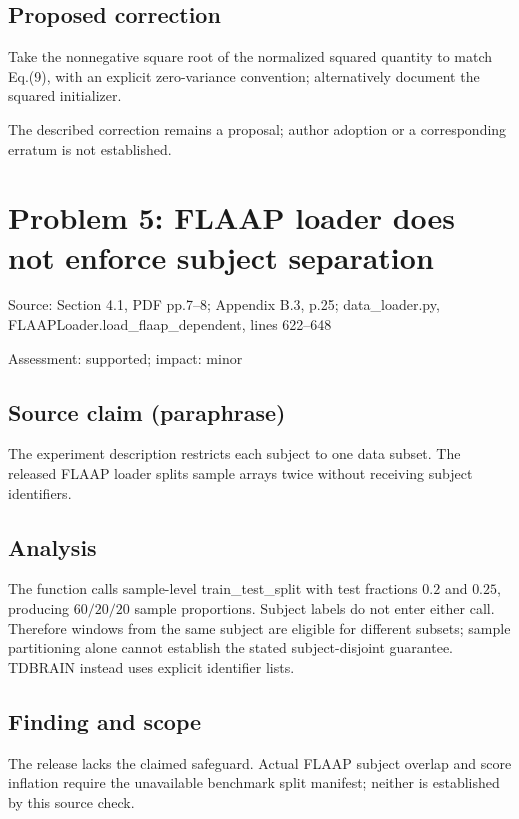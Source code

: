 \documentclass[11pt]{article}
\begin{document}
\subsection*{Proposed correction}

Take the nonnegative square root of the normalized squared quantity to match Eq.(9), with an explicit zero-variance convention; alternatively document the squared initializer.

The described correction remains a proposal; author adoption or a corresponding erratum is not established.

\section*{Problem 5: FLAAP loader does not enforce subject separation}

Source: Section 4.1, PDF pp.7–8; Appendix B.3, p.25; data\_loader.py, FLAAPLoader.load\_flaap\_dependent, lines 622–648

Assessment: supported; impact: minor

\subsection*{Source claim (paraphrase)}

The experiment description restricts each subject to one data subset. The released FLAAP loader splits sample arrays twice without receiving subject identifiers.

\subsection*{Analysis}

The function calls sample-level train\_test\_split with test fractions \(0.2\) and \(0.25\), producing \(60/20/20\) sample proportions. Subject labels do not enter either call. Therefore windows from the same subject are eligible for different subsets; sample partitioning alone cannot establish the stated subject-disjoint guarantee. TDBRAIN instead uses explicit identifier lists.

\subsection*{Finding and scope}

The release lacks the claimed safeguard. Actual FLAAP subject overlap and score inflation require the unavailable benchmark split manifest; neither is established by this source check.
\end{document}
